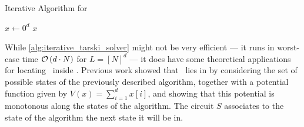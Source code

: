\begin{algorithm}
    \caption{Iterative Algorithm for \Tarski}
    \label{alg:iterative_tarski_solver}
    $x \leftarrow 0^d$ \;
    \Return $x$ \;
\end{algorithm}

While \cref{alg:iterative_tarski_solver} might not be very efficient --- it runs in worst-case time $\mathcal{O}\left(d \cdot N\right)$ for $L = [N]^d$ --- it does have some theoretical applications for locating \Tarski\ inside \TFNP. Previous work  showed that \Tarski\ lies in \PLS by considering the set of possible states of the previously described algorithm, together with a potential function given by $V(x) = \sum_{i=1}^{d}{x[i]}$, and showing that this potential is monotonous along the states of the algorithm. The circuit $S$ associates to the state of the algorithm the next state it will be in.

